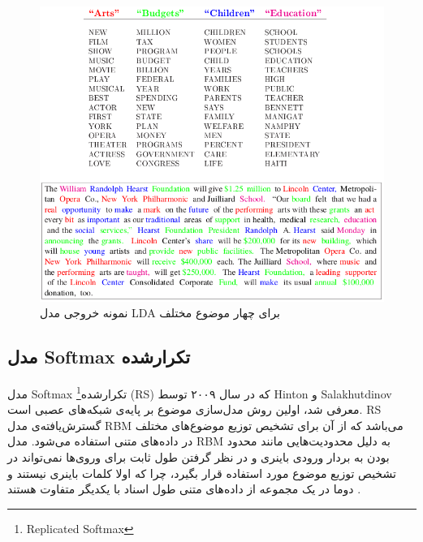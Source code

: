 	\begin{figure}[!t]
		\centering
		\includegraphics[scale=0.4]{chap3-img/LDAexample}
		\caption{نمونه خروجی مدل LDA برای چهار موضوع مختلف \cite{blei2003latent}}
		\label{chap3-fig11}
	\end{figure}



	\subsection{مدل Softmax تکرارشده}
	\label{chap3sec3sub5}
	
	مدل
	Softmax
	تکرارشده\footnote{Replicated Softmax}
	(RS)
	که در سال ۲۰۰۹ توسط
	Hinton
	و
	Salakhutdinov \cite{hinton2009replicated}
	معرفی‌ شد، اولین روش مدل‌سازی موضوع بر پایه‌ی شبکه‌های عصبی است.
	RS
	گسترش‌یافته‌ی مدل
	RBM
	می‌باشد که از آن برای تشخیص توزیع موضوع‌های مختلف در داده‌های متنی استفاده می‌‌شود. مدل
	RBM
	به دلیل محدودیت‌هایی مانند محدود بودن به بردار ورودی باینری و در نظر گرفتن طول ثابت برای وروی‌ها نمی‌‌تواند در تشخیص توزیع موضوع مورد استفاده قرار بگیرد، چرا که اولا کلمات باینری نیستند و دوما در یک مجموعه از داده‌های متنی طول اسناد با یکدیگر متفاوت هستند
	\cite{hinton2009replicated}.
	

